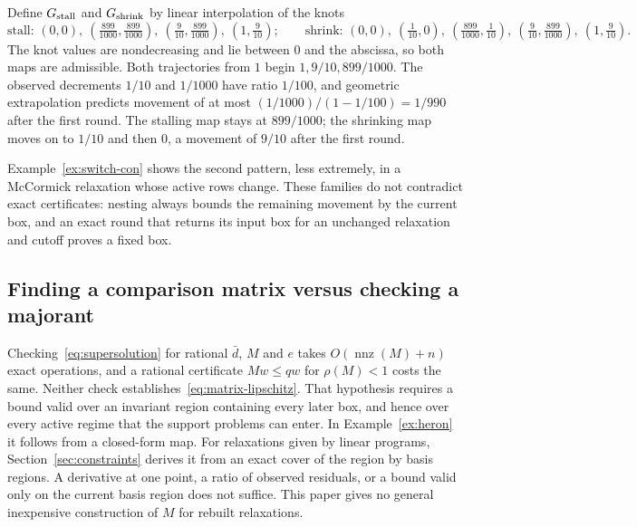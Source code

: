 \begin{example}\label{ex:small-ratio-con}
Define $G_{\rm stall}$ and $G_{\rm shrink}$ by linear interpolation of the
knots
\[
 \text{stall: }(0,0),\ (\tfrac{899}{1000},\tfrac{899}{1000}),\
  (\tfrac9{10},\tfrac{899}{1000}),\ (1,\tfrac9{10});\qquad
 \text{shrink: }(0,0),\ (\tfrac1{10},0),\ (\tfrac{899}{1000},\tfrac1{10}),\
  (\tfrac9{10},\tfrac{899}{1000}),\ (1,\tfrac9{10}).
\]
The knot values are nondecreasing and lie between $0$ and the abscissa, so
both maps are admissible. Both trajectories from $1$ begin
$1,9/10,899/1000$. The observed decrements $1/10$ and $1/1000$ have ratio
$1/100$, and geometric extrapolation predicts movement of at most
$(1/1000)/(1-1/100)=1/990$ after the first round. The stalling map stays
at $899/1000$; the shrinking map moves on to $1/10$ and then $0$, a
movement of $9/10$ after the first round.
\end{example}

Example~\ref{ex:switch-con} shows the second pattern, less extremely, in a
McCormick relaxation whose active rows change. These families do not
contradict exact certificates: nesting always bounds the remaining
movement by the current box, and an exact round that returns its input
box for an unchanged relaxation and cutoff proves a fixed box.

\subsection{Finding a comparison matrix versus checking a majorant}\label{sec:residual-cost}

Checking~\eqref{eq:supersolution} for rational $\bar d$, $M$ and $e$
takes $O(\operatorname{nnz}(M)+n)$ exact operations, and a rational
certificate $Mw\le qw$ for $\rho(M)<1$ costs the same. Neither check
establishes~\eqref{eq:matrix-lipschitz}. That hypothesis requires a bound
valid over an invariant region containing every later box, and hence over
every active regime that the support problems can enter. In
Example~\ref{ex:heron} it follows from a closed-form map. For relaxations
given by linear programs, Section~\ref{sec:constraints} derives it from
an exact cover of the region by basis regions. A derivative at one point,
a ratio of observed residuals, or a bound valid only on the current basis
region does not suffice. This paper gives no general inexpensive
construction of $M$ for rebuilt relaxations.

